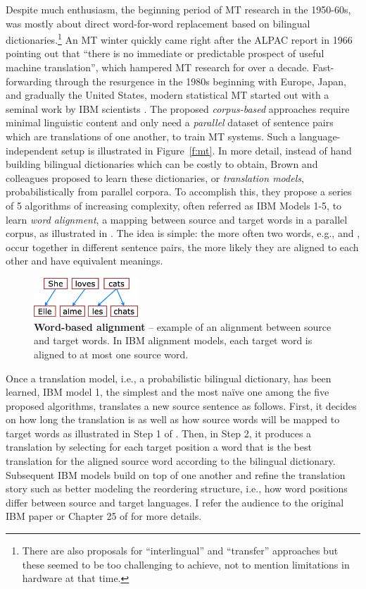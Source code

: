 Despite much enthusiasm, the beginning period of MT research in the 1950-60s,
was mostly about direct word-for-word replacement based on bilingual
dictionaries.\footnote{There are also proposals for ``interlingual'' and
``transfer'' approaches but these seemed to be too challenging to achieve, not
to mention limitations in hardware at that time\cite{hutchins07}.} An MT winter quickly came
right after the ALPAC report in 1966 pointing out that ``there is no immediate
or predictable prospect of useful machine translation'', which hampered MT
research for over a
decade. Fast-forwarding through the resurgence in the 1980s beginning with
Europe, Japan, and gradually the United States,
modern statistical MT started out with a seminal work by IBM scientists
\cite{Brown:1993:MSM}. The proposed {\it corpus-based} approaches require
minimal linguistic content and only need a {\it parallel} dataset of
sentence pairs which are translations of one
another, to train MT systems.
Such a language-independent setup is illustrated in Figure~\ref{f:mt}. 
In more
detail, instead of hand building bilingual dictionaries which can be costly to
obtain, Brown and colleagues proposed to learn these dictionaries, or {\it
translation models}, probabilistically from parallel corpora. To accomplish
this, they propose a series of 5 algorithms of increasing complexity, often
referred as IBM Models 1-5, to learn {\it word alignment},
a mapping between source and target words in a parallel corpus, as illustrated
in . The idea is
simple: the more often two words, e.g.,  and , occur
together in different sentence pairs, the more likely they are aligned to each
other and have equivalent meanings.

\begin{figure}[tbh!]
\centering
\includegraphics[width=0.35\textwidth, clip=true, trim= 0 0 0
0]{img/wordalign.eps}
\caption[Word-based alignment]{{\bf Word-based alignment} -- example of
an alignment between source and target words. In IBM
alignment models, each target word is aligned to at most one source word.
} 
\label{f:wordalign}
\end{figure}

Once a translation model, i.e., a probabilistic bilingual dictionary, has been
learned, IBM model 1, the simplest and the most na\"{i}ve one among the five proposed
algorithms, translates a new source sentence as follows. First, it decides on
how long the translation is as well as how source words will be mapped to target
words as illustrated in Step 1 of . Then,
in Step 2, it produces a translation by selecting for each target position a
word that is the best translation for the aligned source word according to the
bilingual dictionary. Subsequent IBM models build on top of one another and refine the
translation story such as better modeling the reordering structure, i.e., how
word positions differ between source and target languages. I refer the audience to
the original IBM paper or Chapter 25 of \cite{Jurafsky:2009} for more details.

